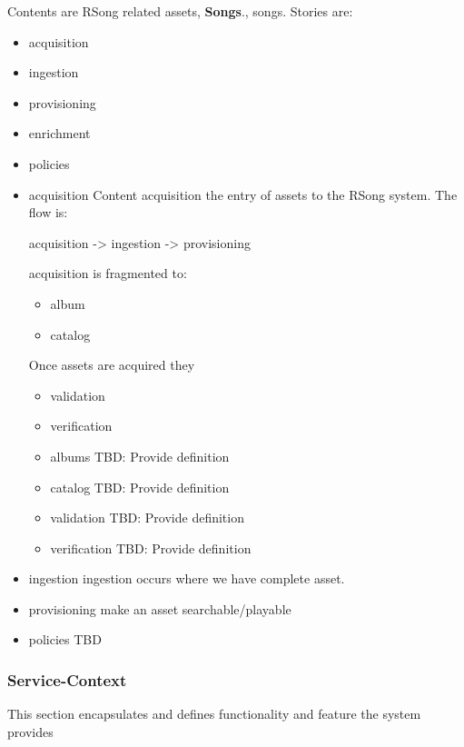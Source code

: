 \documentclass[11pt]{article}
\begin{document}
Contents are RSong related assets, \textbf{Songs}., songs.  Stories are:
\begin{itemize}
\item acquisition
\item ingestion
\item provisioning
\item enrichment
\item policies
\end{itemize}

\begin{itemize}
\item acquisition
\label{sec:org0aaa352}
Content acquisition the entry of assets to the RSong system. The flow is: 

acquisition -> ingestion -> provisioning

acquisition is fragmented to: 
\begin{itemize}
\item album
\item catalog
\end{itemize}
Once assets are acquired they
\begin{itemize}
\item validation
\item verification
\end{itemize}
\begin{itemize}
\item albums
\label{sec:orgd23693b}
TBD: Provide definition 

\item catalog
\label{sec:org0c93c2f}
TBD: Provide definition 

\item validation
\label{sec:org4e920bb}
TBD: Provide definition 

\item verification
\label{sec:org4a43c8d}
TBD: Provide definition
\end{itemize}

\item ingestion
\label{sec:orgd419dc2}
ingestion occurs where we have complete asset.

\item provisioning
\label{sec:org2bbb81c}
make an asset searchable/playable

\item policies
\label{sec:org0480c74}
TBD
\end{itemize}

\subsubsection*{Service-Context}
\label{sec:orgfbb77bd}
This section encapsulates and defines functionality and feature the system provides
\end{document}

